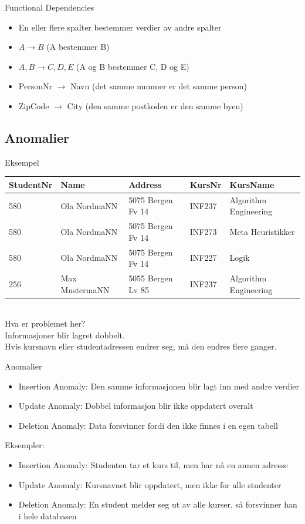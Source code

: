 \begin{frame}{Functional Dependencies}
\begin{itemize}
    \item En eller flere spalter bestemmer verdier av andre spalter
    \item $A \rightarrow B$ (A bestemmer B)
    \item $A,B \rightarrow C, D, E$ (A og B bestemmer C, D og E)
    \item PersonNr $\rightarrow$ Navn (det samme nummer er det samme person)
    \item ZipCode $\rightarrow$ City (den samme postkoden er den samme byen)
\end{itemize}
\end{frame}

\subsection*{Anomalier}
\begin{frame}{Eksempel}
\begin{tabular}{l|l|l|l|l}
 StudentNr & Name & Address & KursNr & KursName \\\hline
 580 & Ola NordmaNN & 5075 Bergen Fv 14 & INF237 & Algorithm Engineering\\
 580 & Ola NordmaNN & 5075 Bergen Fv 14 & INF273 & Meta Heuristikker\\
 580 & Ola NordmaNN & 5075 Bergen Fv 14 & INF227 & Logik\\
 256 & Max MustermaNN & 5055 Bergen Lv 85 & INF237 & Algorithm Engineering\\
\end{tabular}
\\[5mm]
Hva er problemet her?\\
Informasjoner blir lagret dobbelt.\\
Hvis kursnavn eller studentadressen endrer seg, må den endres flere ganger.
\end{frame}

\begin{frame}{Anomalier}
\begin{itemize}
    \item Insertion Anomaly: Den samme informasjonen blir lagt inn med andre verdier
    \item Update Anomaly: Dobbel informasjon blir ikke oppdatert overalt
    \item Deletion Anomaly: Data forsvinner fordi den ikke finnes i en egen tabell
\end{itemize}
\medskip
Eksempler:
\begin{itemize}
    \item Insertion Anomaly: Studenten tar et kurs til, men har nå en annen adresse 
    \item Update Anomaly: Kursnavnet blir oppdatert, men ikke for alle studenter
    \item Deletion Anomaly: En student melder seg ut av alle kurser, så forsvinner han i hele databasen
\end{itemize}
\end{frame}

